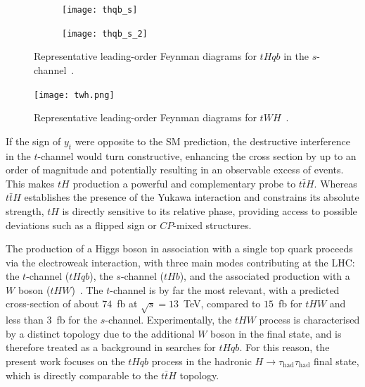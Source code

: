   \begin{figure}[htbp]
    \centering
    \begin{subfigure}[b]{0.4\textwidth}
      \centering
      \texttt{[image: thqb\_s]}
    \end{subfigure}
    \begin{subfigure}[b]{0.4\textwidth}
      \centering
      \texttt{[image: thqb\_s\_2]}
    \end{subfigure}
    \caption{Representative leading-order Feynman diagrams for $tHqb$ in the $s$-channel~\cite{Barger_2010}.}
    \label{fig:feynman_tH_s}
  \end{figure}

\begin{figure}[htbp]
    \centering
    \texttt{[image: twh.png]}
    \caption{Representative leading-order Feynman diagrams for $tWH$~\cite{twh}.}
    \label{fig:feynman_tWH}
  \end{figure}

If the sign of $y_{t}$ were opposite to the SM prediction, the destructive interference in the $t$-channel would turn constructive, enhancing the cross section by up to an order of magnitude and potentially resulting in an observable excess of events. 
This makes $tH$ production a powerful and complementary probe to $t\bar{t}H$. 
Whereas $t\bar{t}H$ establishes the presence of the Yukawa interaction and constrains its absolute strength, $tH$ is directly sensitive to its relative phase, providing access to possible deviations such as a flipped sign or $CP$-mixed structures. 
  
  
  The production of a Higgs boson in association with a single top quark proceeds via the electroweak interaction, with three main modes contributing at the LHC: the $t$-channel ($tHqb$), the $s$-channel ($tHb$), and the associated production with a $W$ boson ($tHW$)~\cite{demartin2015higgsproductionassociationsingle,Demartin_2017}. 
  The $t$-channel is by far the most relevant, with a predicted cross-section of about $74$~fb at $\sqrt{s}=13$~TeV, compared to $15$~fb for $tHW$ and less than $3$~fb for the $s$-channel. 
  Experimentally, the $tHW$ process is characterised by a distinct topology due to the additional $W$ boson in the final state, and is therefore treated as a background in searches for $tHqb$. 
  For this reason, the present work focuses on the $tHqb$ process in the hadronic $H\to\tau_{\mathrm{had}}\tau_{\mathrm{had}}$ final state, which is directly comparable to the $t\bar{t}H$ topology. 
  
